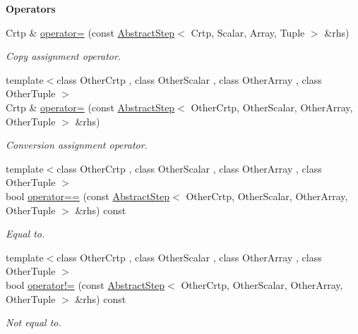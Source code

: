 \begin{Indent}{\bf Operators}\par
\begin{DoxyCompactItemize}
\item 
Crtp \& \hyperlink{classmagrathea_1_1AbstractStep_ae717165a76d3f1a497a4bd3567e35a45}{operator=} (const \hyperlink{classmagrathea_1_1AbstractStep}{Abstract\-Step}$<$ Crtp, Scalar, Array, Tuple $>$ \&rhs)
\begin{DoxyCompactList}\small\item\em Copy assignment operator. \end{DoxyCompactList}\item 
{\footnotesize template$<$class Other\-Crtp , class Other\-Scalar , class Other\-Array , class Other\-Tuple $>$ }\\Crtp \& \hyperlink{classmagrathea_1_1AbstractStep_afeba5101a495fd1aba6bc2b0280e1789}{operator=} (const \hyperlink{classmagrathea_1_1AbstractStep}{Abstract\-Step}$<$ Other\-Crtp, Other\-Scalar, Other\-Array, Other\-Tuple $>$ \&rhs)
\begin{DoxyCompactList}\small\item\em Conversion assignment operator. \end{DoxyCompactList}\item 
{\footnotesize template$<$class Other\-Crtp , class Other\-Scalar , class Other\-Array , class Other\-Tuple $>$ }\\bool \hyperlink{classmagrathea_1_1AbstractStep_a25cd4b3ae4798c009f9e3b7d4732f4ce}{operator==} (const \hyperlink{classmagrathea_1_1AbstractStep}{Abstract\-Step}$<$ Other\-Crtp, Other\-Scalar, Other\-Array, Other\-Tuple $>$ \&rhs) const 
\begin{DoxyCompactList}\small\item\em Equal to. \end{DoxyCompactList}\item 
{\footnotesize template$<$class Other\-Crtp , class Other\-Scalar , class Other\-Array , class Other\-Tuple $>$ }\\bool \hyperlink{classmagrathea_1_1AbstractStep_aed7136ca921c369f501f90337bc86460}{operator!=} (const \hyperlink{classmagrathea_1_1AbstractStep}{Abstract\-Step}$<$ Other\-Crtp, Other\-Scalar, Other\-Array, Other\-Tuple $>$ \&rhs) const 
\begin{DoxyCompactList}\small\item\em Not equal to. \end{DoxyCompactList}\end{DoxyCompactItemize}
\end{Indent}
